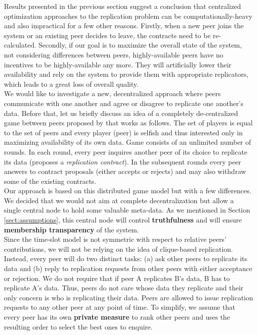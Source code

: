 \documentclass{pracamgren}
\begin{document}
Results presented in the previous section suggest a conclusion that centralized optimization approaches to the replication problem can be computationally-heavy and also impractical for a few other reasons. Firstly, when a new peer joins the system or an existing peer decides to leave, the contracts need to be re-calculated. Secondly, if our goal is to maximize the overall state of the system, not considering differences between peers, highly-available peers have no incentives to be highly-available any more. They will artificially lower their availability and rely on the system to provide them with appropriate replicators, which leads to a great loss of overall quality.\\

We would like to investigate a new, decentralized approach where peers communicate with one another and agree or disagree to replicate one another's data. Before that, let us briefly discuss an idea of a completely de-centralized game between peers proposed by \cite{krz} that works as follows. The set of players is equal to the set of peers and every player (peer) is selfish and thus interested only in maximizing availability of its own data. Game consists of an unlimited number of rounds. In each round, every peer inquires another peer of its choice to replicate its data (proposes a {\it replication contract}). In the subsequent rounds every peer answers to contract proposals (either accepts or rejects) and may also withdraw some of the existing contracts.\\

Our approach is based on this distributed game model but with a few differences. We decided that we would not aim at complete decentralization but allow a single central node to hold some valuable meta-data. As we mentioned in Section \ref{sect:assumptions}, this central node will control {\bf truthfulness} and will ensure {\bf membership transparency} of the system.\\

Since the time-slot model is not symmetric with respect to relative peers' contributions, we will not be relying on the idea of clique-based replication. Instead, every peer will do two distinct tasks: (a) ask other peers to replicate its data and (b) reply to replication requests from other peers with either acceptance or rejection. We do not require that if peer A replicates B's data, B has to replicate A's data. Thus, peers do not care whose data they replicate and their only concern is who is replicating their data. Peers are allowed to issue replication requests to any other peer at any point of time. To simplify, we assume that every peer has its own {\bf private measure} to rank other peers and uses the resulting order to select the best ones to enquire.\\
\end{document}
